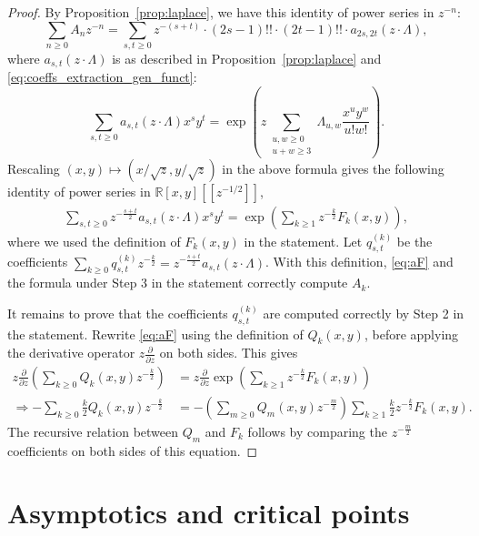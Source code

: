 \documentclass[english]{ourlematemasingle}
\numberwithin{theorem}{section}
\theoremstyle{remark}
\newcommand{\R}{\mathbb{R}}
\begin{document}
\begin{proof}
    By Proposition~\ref{prop:laplace}, we have this identity of power series in $z^{-n}$:
    \[
        \sum_{n\geq 0} A_n z^{-n} = \sum_{s,t\geq 0} z^{-(s+t)}\cdot(2s-1)!!\cdot (2t-1)!!\cdot a_{2s,2t}(z \cdot \Lambda),
    \]
where $a_{s,t}(z \cdot \Lambda)$ is as described in Proposition~\ref{prop:laplace} and \eqref{eq:coeffs_extraction_gen_funct}:
$$
\sum_{s,t \geq 0} 
 a_{s,t}(z \cdot \Lambda) x^s y^t = 
\exp
\left(
z
\sum_{\substack{u,w \geq 0\\ u+w \geq 3}} \Lambda_{u,w} \frac{x^uy^w}{u!w!}
\right).
$$
Rescaling $(x,y) \mapsto (x/\sqrt{z},y/\sqrt{z})$ in the above formula gives the following identity of 
power series in $\R[x,y][[z^{-1/2}]]$,
\begin{align}
\label{eq:aF}
\sum_{s,t \geq 0} 
 z^{-\frac{s+t}{2}} a_{s,t}(z \cdot \Lambda) x^s y^t = 
\exp
\left(
\sum_{k \geq 1} z^{-\frac{k}{2}}
F_k(x,y)
\right),
\end{align}
where we used the definition of $F_k(x,y)$ in the statement.
Let $q_{s,t}^{(k)}$ be the coefficients 
$
\sum_{k \geq 0} q_{s,t}^{(k)} z^{-\frac{k}{2}} = 
z^{-\frac{s+t}{2}} a_{s,t}(z \cdot \Lambda)$.
With this definition, \eqref{eq:aF} and the formula under Step 3 in the statement
correctly compute $A_k$.

It remains to prove that the coefficients $q_{s,t}^{(k)}$ are computed correctly by Step 2 in the statement.
Rewrite \eqref{eq:aF} using the definition of $Q_k(x,y)$, before applying the derivative operator $z\frac{\partial}{\partial z}$ on both sides. This gives
\begin{align*}
z\frac{\partial}{\partial z}\left(\sum_{k \geq 0}Q_k(x,y) z^{-\frac{k}{2}}\right)
&=
z\frac{\partial}{\partial z}\exp\left(\sum_{k \geq 1} z^{-\frac{k}{2}}F_k(x,y)\right)\\
\Rightarrow
-\sum_{k \geq 0}\frac{k}{2}Q_k(x,y) z^{-\frac{k}{2}}
&=
-\left(\sum_{m \geq 0}Q_m(x,y) z^{-\frac{m}{2}}\right)\sum_{k \geq 1} \frac{k}{2}z^{-\frac{k}{2}}F_k(x,y).
\end{align*}
The recursive relation between $Q_m$ and $F_k$ follows
by comparing the $z^{-\frac{m}{2}}$ coefficients on both sides of this equation.
\end{proof}

\section{Asymptotics and critical points}
\label{sec:asymptotics}
\end{document}
